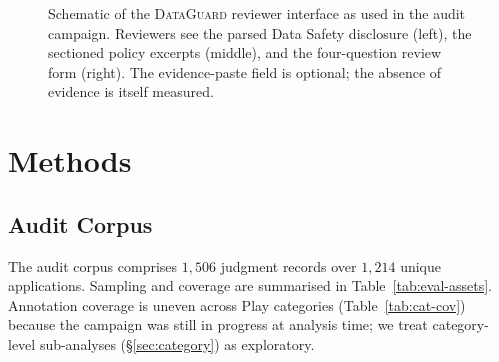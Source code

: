 \documentclass[11pt,a4paper]{article}
\newcommand{\dataguard}{\textsc{DataGuard}}
\begin{document}
\begin{figure}[!htbp]
\caption{Schematic of the \dataguard{} reviewer interface as used in
the audit campaign. Reviewers see the parsed Data Safety disclosure
(left), the sectioned policy excerpts (middle), and the four-question
review form (right). The evidence-paste field is optional; the
absence of evidence is itself measured.}
\label{fig:ui}
\end{figure}

\section{Methods}
\label{sec:methods}

\subsection{Audit Corpus}
\label{sec:methods-corpus}

The audit corpus comprises $1{,}506$ judgment records over $1{,}214$
unique applications. Sampling and coverage are summarised in
Table~\ref{tab:eval-assets}. Annotation coverage is uneven across
Play categories (Table~\ref{tab:cat-cov}) because the campaign was
still in progress at analysis time; we treat category-level
sub-analyses (\S\ref{sec:category}) as exploratory.
\end{document}
